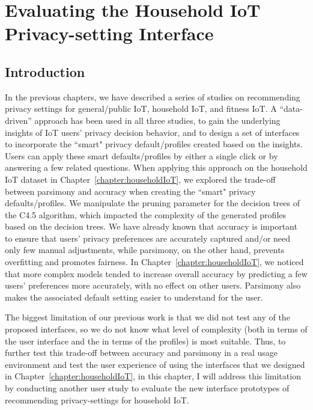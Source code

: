 \chapter{Evaluating the Household IoT Privacy-setting Interface}\label{chapter:evaluation}

\section{Introduction}

In the previous chapters, we have described a series of studies on recommending privacy settings for general/public IoT, household IoT, and fitness IoT. A ``data-driven” approach has been used in all three studies, to gain the underlying insights of IoT users' privacy decision behavior, and to design a set of interfaces to incorporate the ``smart" privacy default/profiles created based on the insights. Users can apply these smart defaults/profiles by either a single click or by answering a few related questions. When applying this approach on the household IoT dataset in Chapter~\ref{chapter:householdIoT}, we explored the trade-off between parsimony and accuracy when creating the ``smart" privacy defaults/profiles. We manipulate the pruning parameter for the decision trees of the C4.5 algorithm, which impacted the complexity of the generated profiles based on the decision trees. We have already known that accuracy is important to ensure that users' privacy preferences are accurately captured and/or need only few manual adjustments, while parsimony, on the other hand, prevents overfitting and promotes fairness. In Chapter~\ref{chapter:householdIoT}, we noticed that more complex models tended to increase overall accuracy by predicting a few users' preferences more accurately, with no effect on other users. Parsimony also makes the associated default setting easier to understand for the user. 

The biggest limitation of our previous work is that we did not test any of the proposed interfaces, so we do not know what level of complexity (both in terms of the user interface and the in terms of the profiles) is most suitable. Thus, to further test this trade-off between accuracy and parsimony in a real usage environment and test the user experience of using the interfaces that we designed in Chapter~\ref{chapter:householdIoT}, in this chapter, I will address this limitation by conducting another user study to evaluate the new interface prototypes of recommending privacy-settings for household IoT.

